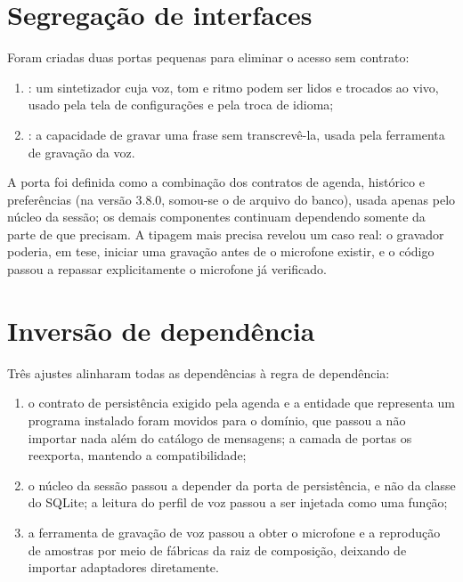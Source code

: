 \section{Segregação de interfaces}

Foram criadas duas portas pequenas para eliminar o acesso sem contrato:
\begin{enumerate}[label=\alph*)]
  \item {}: um sintetizador cuja voz, tom e ritmo podem ser lidos e trocados
        ao vivo, usado pela tela de configurações e pela troca de idioma;
  \item {}: a capacidade de gravar uma frase sem transcrevê-la, usada pela ferramenta de
        gravação da voz.
\end{enumerate}
A porta  foi definida como a combinação dos contratos de agenda, histórico e
preferências (na versão 3.8.0, somou-se o de arquivo do banco), usada apenas pelo núcleo da sessão; os demais componentes continuam dependendo somente da
parte de que precisam. A tipagem mais precisa revelou um caso real: o gravador poderia, em tese,
iniciar uma gravação antes de o microfone existir, e o código passou a repassar explicitamente o
microfone já verificado.

\section{Inversão de dependência}

Três ajustes alinharam todas as dependências à regra de dependência:

\begin{enumerate}[label=\alph*)]
  \item o contrato de persistência exigido pela agenda e a entidade que representa um programa
        instalado foram movidos para o domínio, que passou a não importar nada além do catálogo de
        mensagens; a camada de portas os reexporta, mantendo a compatibilidade;
  \item o núcleo da sessão passou a depender da porta de persistência, e não da classe do SQLite; a
        leitura do perfil de voz passou a ser injetada como uma função;
  \item a ferramenta de gravação de voz passou a obter o microfone e a reprodução de amostras por meio
        de fábricas da raiz de composição, deixando de importar adaptadores diretamente.
\end{enumerate}

